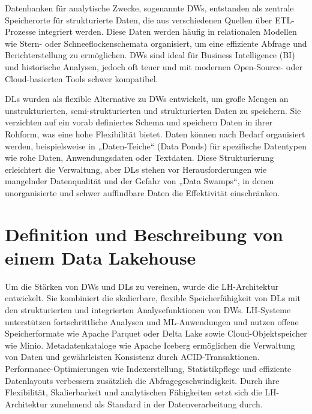 Datenbanken für analytische Zwecke, sogenannte \ac{DW}s, entstanden als zentrale Speicherorte für strukturierte Daten, die aus verschiedenen Quellen über \ac{ETL}-Prozesse integriert werden. Diese Daten werden häufig in relationalen Modellen wie Stern- oder Schneeflockenschemata organisiert, um eine effiziente Abfrage und Berichterstellung zu ermöglichen. \ac{DW}s sind ideal für Business Intelligence (BI) und historische Analysen, jedoch oft teuer und mit modernen Open-Source- oder Cloud-basierten Tools schwer kompatibel.

\ac{DL}s wurden als flexible Alternative zu \ac{DW}s entwickelt, um große Mengen an unstrukturierten, semi-strukturierten und strukturierten Daten zu speichern. Sie verzichten auf ein vorab definiertes Schema und speichern Daten in ihrer Rohform, was eine hohe Flexibilität bietet. Daten können nach Bedarf organisiert werden, beispielsweise in „Daten-Teiche“ (Data Ponds) für spezifische Datentypen wie rohe Daten, Anwendungsdaten oder Textdaten. Diese Strukturierung erleichtert die Verwaltung, aber \ac{DL}s stehen vor Herausforderungen wie mangelnder Datenqualität und der Gefahr von „Data Swamps“, in denen unorganisierte und schwer auffindbare Daten die Effektivität einschränken.

\section{Definition und Beschreibung von einem Data Lakehouse}
Um die Stärken von \ac{DW}s und \ac{DL}s zu vereinen, wurde die \ac{LH}-Architektur entwickelt. Sie kombiniert die skalierbare, flexible Speicherfähigkeit von \ac{DL}s mit den strukturierten und integrierten Analysefunktionen von \ac{DW}s. \ac{LH}-Systeme unterstützen fortschrittliche Analysen und \ac{ML}-Anwendungen und nutzen offene Speicherformate wie Apache Parquet oder Delta Lake sowie Cloud-Objektspeicher wie Minio. Metadatenkataloge wie Apache Iceberg ermöglichen die Verwaltung von Daten und gewährleisten Konsistenz durch ACID-Transaktionen. Performance-Optimierungen wie Indexerstellung, Statistikpflege und effiziente Datenlayouts verbessern zusätzlich die Abfragegeschwindigkeit. Durch ihre Flexibilität, Skalierbarkeit und analytischen Fähigkeiten setzt sich die LH-Architektur zunehmend als Standard in der Datenverarbeitung durch.
